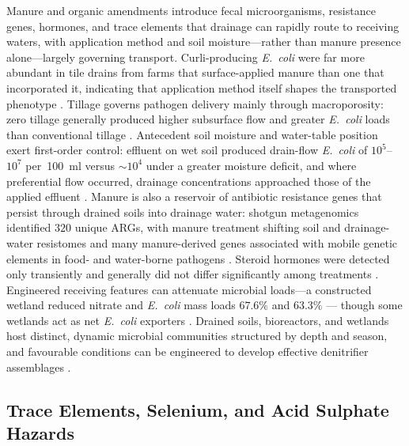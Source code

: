 Manure and organic amendments introduce fecal microorganisms, resistance genes,
hormones, and trace elements that drainage can rapidly route to receiving waters,
with application method and soil moisture---rather than manure presence
alone---largely governing transport. Curli-producing \textit{E.\ coli} were far
more abundant in tile drains from farms that surface-applied manure than one that
incorporated it, indicating that application method itself shapes the transported
phenotype \parencite{Truhlar2015}. Tillage governs pathogen delivery mainly
through macroporosity: zero tillage generally produced higher subsurface flow and
greater \textit{E.\ coli} loads than conventional tillage
\parencite{Thiagarajan2007,Jenkins2009}. Antecedent soil moisture and water-table
position exert first-order control: effluent on wet soil produced drain-flow
\textit{E.\ coli} of $10^{5}$--$10^{7}$ per~100~ml versus $\sim10^{4}$ under a
greater moisture deficit, and where preferential flow occurred, drainage
concentrations approached those of the applied effluent
\parencite{Collins2007,Ding2021}. Manure is also a reservoir of antibiotic
resistance genes that persist through drained soils into drainage water: shotgun
metagenomics identified $320$ unique ARGs, with manure treatment shifting soil
and drainage-water resistomes and many manure-derived genes associated with
mobile genetic elements in food- and water-borne pathogens \parencite{Smith2019b}.
Steroid hormones were detected only transiently and generally did not differ
significantly among treatments \parencite{Jenkins2009}. Engineered receiving
features can attenuate microbial loads---a constructed wetland reduced nitrate and
\textit{E.\ coli} mass loads $67.6\%$ and $63.3\%$ \parencite{Haverstock2017}---
though some wetlands act as net \textit{E.\ coli} exporters \parencite{Stott2023}.
Drained soils, bioreactors, and wetlands host distinct, dynamic microbial
communities structured by depth and season, and favourable conditions can be
engineered to develop effective denitrifier assemblages
\parencite{Andrus2014,Porter2015,Hathaway2015,Knorr2023,Schilling2017}.

\subsection{Trace Elements, Selenium, and Acid Sulphate Hazards}

